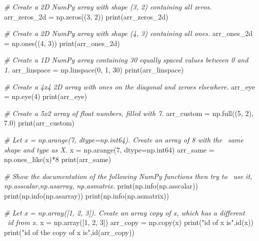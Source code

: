 \documentclass[11pt]{article}
\newenvironment{Shaded}{}{}
\newcommand{\DecValTok}[1]{\textcolor[rgb]{0.25,0.63,0.44}{{#1}}}
\newcommand{\FloatTok}[1]{\textcolor[rgb]{0.25,0.63,0.44}{{#1}}}
\newcommand{\StringTok}[1]{\textcolor[rgb]{0.25,0.44,0.63}{{#1}}}
\newcommand{\CommentTok}[1]{\textcolor[rgb]{0.38,0.63,0.69}{\textit{{#1}}}}
\newcommand{\NormalTok}[1]{{#1}}
\newcommand{\OperatorTok}[1]{\textcolor[rgb]{0.40,0.40,0.40}{{#1}}}
\newcommand{\BuiltInTok}[1]{{#1}}
\begin{document}
\begin{Shaded}
\begin{tcolorbox}[breakable, size=fbox, boxrule=1pt, pad at break*=1mm,colback=cellbackground, colframe=cellborder]
\begin{Highlighting}[]
\CommentTok{\# Create a 2D NumPy array with shape (3, 2) containing all zeros.}
\NormalTok{arr\_zeros\_2d }\OperatorTok{=}\NormalTok{ np.zeros((}\DecValTok{3}\NormalTok{, }\DecValTok{2}\NormalTok{))}
\BuiltInTok{print}\NormalTok{(arr\_zeros\_2d)}

\CommentTok{\# Create a 2D NumPy array with shape (4, 3) containing all ones.}
\NormalTok{arr\_ones\_2d }\OperatorTok{=}\NormalTok{ np.ones((}\DecValTok{4}\NormalTok{, }\DecValTok{3}\NormalTok{))}
\BuiltInTok{print}\NormalTok{(arr\_ones\_2d)}

\CommentTok{\# Create a 1D NumPy array containing 30 equally spaced values between 0 and 1.}
\NormalTok{arr\_linspace }\OperatorTok{=}\NormalTok{ np.linspace(}\DecValTok{0}\NormalTok{, }\DecValTok{1}\NormalTok{, }\DecValTok{30}\NormalTok{)}
\BuiltInTok{print}\NormalTok{(arr\_linspace)}

\CommentTok{\# Create a 4x4 2D array with ones on the diagonal and zeroes elsewhere.}
\NormalTok{arr\_eye }\OperatorTok{=}\NormalTok{ np.eye(}\DecValTok{4}\NormalTok{)}
\BuiltInTok{print}\NormalTok{(arr\_eye)}

\CommentTok{\# Create a 5x2 array of float numbers, filled with 7.}
\NormalTok{arr\_custom }\OperatorTok{=}\NormalTok{ np.full((}\DecValTok{5}\NormalTok{, }\DecValTok{2}\NormalTok{), }\FloatTok{7.0}\NormalTok{)}
\BuiltInTok{print}\NormalTok{(arr\_custom)}

\CommentTok{\# Let x = np.arange(7, dtype=np.int64). Create an array of 8 with the }
\CommentTok{\ same shape and type as X.}
\NormalTok{x }\OperatorTok{=}\NormalTok{ np.arange(}\DecValTok{7}\NormalTok{, dtype}\OperatorTok{=}\NormalTok{np.int64)}
\NormalTok{arr\_same }\OperatorTok{=}\NormalTok{ np.ones\_like(x)}\OperatorTok{*}\DecValTok{8}
\BuiltInTok{print}\NormalTok{(arr\_same)}

\CommentTok{\# Show the documentation of the following NumPy functions then try to }
\CommentTok{\ use it, np.asscalar,np.asarray, np.asmatrix.}
\BuiltInTok{print}\NormalTok{(np.info(np.asscalar))}
\BuiltInTok{print}\NormalTok{(np.info(np.asarray))}
\BuiltInTok{print}\NormalTok{(np.info(np.asmatrix))}

\CommentTok{\# Let x = np.array([1, 2, 3]). Create an array copy of x, which has a different}
\CommentTok{\  id from x.}
\NormalTok{x }\OperatorTok{=}\NormalTok{ np.array([}\DecValTok{1}\NormalTok{, }\DecValTok{2}\NormalTok{, }\DecValTok{3}\NormalTok{])}
\NormalTok{arr\_copy }\OperatorTok{=}\NormalTok{ np.copy(x)}
\BuiltInTok{print}\NormalTok{(}\StringTok{"id of x is"}\NormalTok{,}\BuiltInTok{id}\NormalTok{(x))}
\BuiltInTok{print}\NormalTok{(}\StringTok{"id of the copy of x is"}\NormalTok{,}\BuiltInTok{id}\NormalTok{(arr\_copy))}


\end{Highlighting}
\end{tcolorbox}
\end{Shaded}
\end{document}
